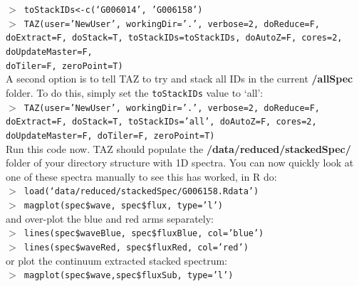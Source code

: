 \documentclass[12pt]{article}
\begin{document}
   \hspace{10mm} \texttt{$>$ toStackIDs<-c(`G006014', 'G006158')}\\
 
  \hspace{10mm} \texttt{$>$ TAZ(user='NewUser', workingDir='.', verbose=2, doReduce=F, doExtract=F, doStack=T,  toStackIDs=toStackIDs, doAutoZ=F, cores=2, doUpdateMaster=F, \\ doTiler=F, zeroPoint=T)}\\ 
  
 A second option is to tell TAZ to try and stack all IDs in the current \textbf{/allSpec} folder. To do this, simply set the \texttt{toStackIDs} value to `all': \\
  

  \hspace{10mm} \texttt{$>$ TAZ(user='NewUser', workingDir='.', verbose=2, doReduce=F, doExtract=F, doStack=T,  toStackIDs='all', doAutoZ=F, cores=2, doUpdateMaster=F, doTiler=F, zeroPoint=T)}\\   

Run this code now. TAZ should populate the \textbf{/data/reduced/stackedSpec/} folder of your directory structure with 1D spectra. You can now quickly look at one of these spectra manually to see this has worked, in R do:\\

\hspace{10mm} \texttt{$>$ load(`data/reduced/stackedSpec/G006158.Rdata')} \\

\hspace{10mm} \texttt{$>$ magplot(spec\$wave, spec\$flux, type='l')} \\

and over-plot the blue and red arms separately:\\


\hspace{10mm} \texttt{$>$ lines(spec\$waveBlue, spec\$fluxBlue, col='blue')}\\

\hspace{10mm} \texttt{$>$ lines(spec\$waveRed, spec\$fluxRed, col='red')}\\

or plot the continuum extracted stacked spectrum:\\

\hspace{10mm} \texttt{$>$ magplot(spec\$wave,spec\$fluxSub, type='l')}\\
\end{document}

